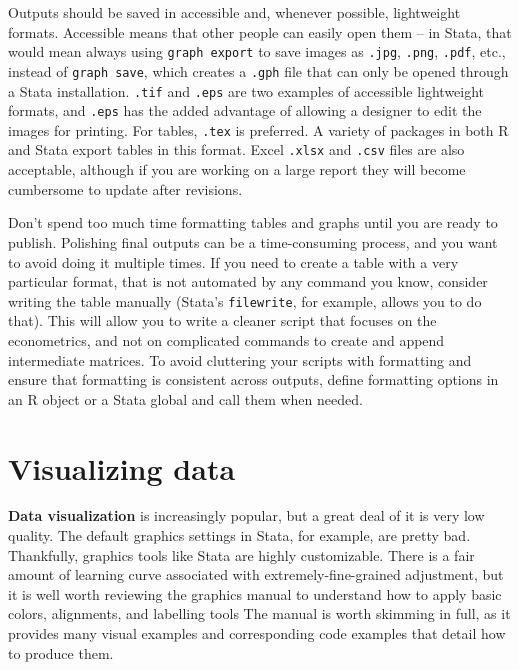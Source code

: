 Outputs should be saved in accessible and, whenever possible, lightweight formats.
Accessible means that other people can easily open them  -- 
in Stata, that would mean always using \texttt{graph export} 
to save images as \texttt{.jpg}, \texttt{.png}, \texttt{.pdf}, etc.,
instead of \texttt{graph save}, which creates a \texttt{.gph} file 
that can only be opened through a Stata installation.
\texttt{.tif} and \texttt{.eps} are two examples of accessible lightweight formats,
and \texttt{.eps} has the added advantage of allowing a designer to edit the images for printing.
For tables, \texttt{.tex} is preferred. 
A variety of packages in both R and Stata export tables in this format.
Excel \texttt{.xlsx} and \texttt{.csv} files are also acceptable,
although if you are working on a large report they will become cumbersome to update after revisions.

Don't spend too much time formatting tables and graphs until you are ready to publish. 
Polishing final outputs can be a time-consuming process, 
and you want to avoid doing it multiple times.
If you need to create a table with a very particular format, 
that is not automated by any command you know,
consider writing the table manually 
(Stata's \texttt{filewrite}, for example, allows you to do that).
This will allow you to write a cleaner script that focuses on the econometrics, 
and not on complicated commands to create and append intermediate matrices.
To avoid cluttering your scripts with formatting and ensure that formatting is consistent across outputs,
define formatting options in an R object or a Stata global and call them when needed.


\section{Visualizing data}

\textbf{Data visualization} is increasingly popular,
but a great deal of it is very low quality.\cite{healy2018data,wilke2019fundamentals}
The default graphics settings in Stata, for example,
are pretty bad.
Thankfully, graphics tools like Stata are highly customizable.
There is a fair amount of learning curve associated with
extremely-fine-grained adjustment,
but it is well worth reviewing the graphics manual
to understand how to apply basic colors, alignments, and labelling tools
The manual is worth skimming in full, as it provides
many visual examples and corresponding code examples
that detail how to produce them.

